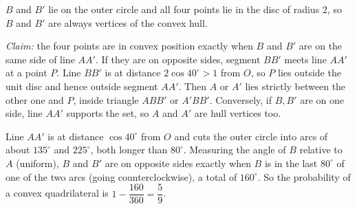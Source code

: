 $B$ and $B'$ lie on the outer circle and all four points lie in the disc of radius $2$, so $B$ and $B'$ are always vertices of the convex hull.

\emph{Claim:} the four points are in convex position exactly when $B$ and $B'$ are on the same side of line $AA'$. If they are on opposite sides, segment $BB'$ meets line $AA'$ at a point $P$. Line $BB'$ is at distance $2\cos40^\circ>1$ from $O$, so $P$ lies outside the unit disc and hence outside segment $AA'$. Then $A$ or $A'$ lies strictly between the other one and $P$, inside triangle $ABB'$ or $A'BB'$. Conversely, if $B,B'$ are on one side, line $AA'$ supports the set, so $A$ and $A'$ are hull vertices too.

Line $AA'$ is at distance $\cos40^\circ$ from $O$ and cuts the outer circle into arcs of about $135^\circ$ and $225^\circ$, both longer than $80^\circ$. Measuring the angle of $B$ relative to $A$ (uniform), $B$ and $B'$ are on opposite sides exactly when $B$ is in the last $80^\circ$ of one of the two arcs (going counterclockwise), a total of $160^\circ$. So the probability of a convex quadrilateral is $1-\dfrac{160}{360}=\boxed{\dfrac59}$.
